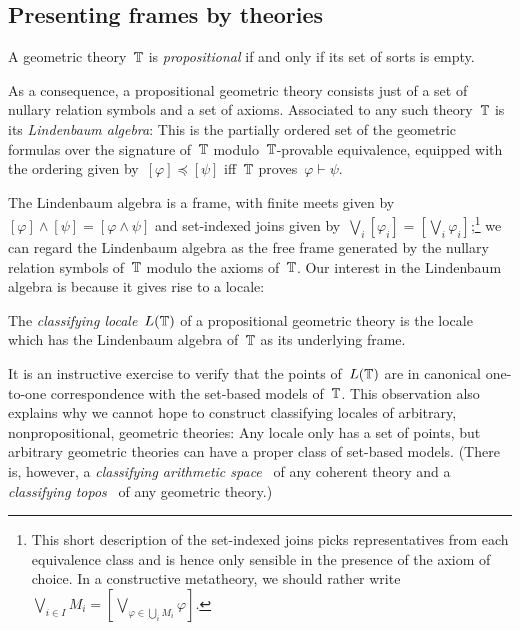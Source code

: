 \documentclass{ws-rv9x6}
\begin{document}
{\subsection{Presenting frames by theories}
\label{sect:presenting-frames}

\begin{definition}A geometric theory~$\mathbb{T}$ is \emph{propositional} if and only
if its set of sorts is empty.\end{definition}

As a consequence, a propositional geometric theory consists just of a set of
nullary relation symbols and a set of axioms. Associated to any such
theory~$\mathbb{T}$ is its \emph{Lindenbaum algebra}: This is the partially ordered
set of the geometric formulas over the signature of~$\mathbb{T}$ modulo~$\mathbb{T}$-provable
equivalence, equipped with the ordering given by~$[\varphi] \preceq [\psi]$ iff~$\mathbb{T}$
proves~$\varphi \vdash \psi$.

The Lindenbaum algebra is a frame, with finite meets given by~$[\varphi] \wedge
[\psi] = [\varphi \wedge \psi]$ and set-indexed joins given by~$\bigvee_i
[\varphi_i] = [\bigvee_i \varphi_i]$;\footnote{This short description of the
set-indexed joins picks representatives from each equivalence class and is
hence only sensible in the presence of the axiom of choice. In a
constructive metatheory, we should rather write~$\bigvee_{i \in I} M_i =
[\bigvee_{\varphi \in \bigcup_i M_i} \varphi]$.}
we can regard the Lindenbaum algebra as the free
frame generated by the nullary relation symbols of~$\mathbb{T}$ modulo the axioms
of~$\mathbb{T}$. Our interest in the Lindenbaum algebra is because it gives rise to a
locale:

\begin{definition}The \emph{classifying locale}~$L(\mathbb{T})$ of a propositional
geometric theory is the locale which has the Lindenbaum algebra of~$\mathbb{T}$ as its
underlying frame.\end{definition}

It is an instructive exercise to verify that the points of~$L(\mathbb{T})$ are in
canonical one-to-one correspondence with the set-based models of~$\mathbb{T}$. This
observation also explains why we cannot hope to construct classifying
locales of arbitrary, nonpropositional, geometric theories: Any locale only has
a set of points, but arbitrary geometric theories can have a proper class of
set-based models. (There is, however, a \emph{classifying arithmetic
space}~\cite{vickers:sketches} of any coherent theory and a \emph{classifying
topos}~\cite[Section~2]{caramello:tst} of any geometric theory.)

}
\end{document}
